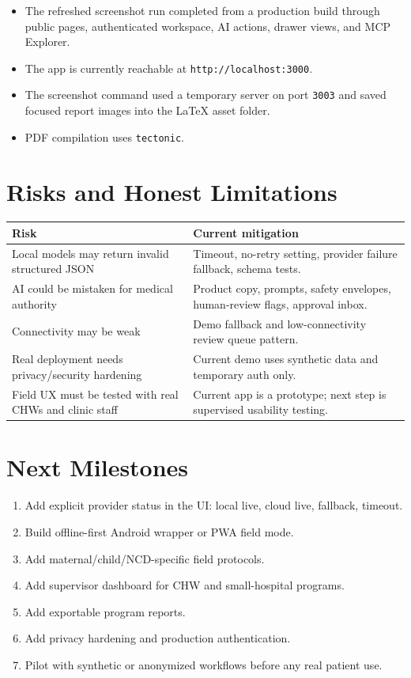 \documentclass[11pt,letterpaper]{article}
\begin{document}
\begin{itemize}
  \item The refreshed screenshot run completed from a production build through public pages, authenticated workspace, AI actions, drawer views, and MCP Explorer.
  \item The app is currently reachable at \texttt{http://localhost:3000}.
  \item The screenshot command used a temporary server on port \texttt{3003} and saved focused report images into the LaTeX asset folder.
  \item PDF compilation uses \texttt{tectonic}.
\end{itemize}

\section{Risks and Honest Limitations}

\begin{table}[H]
\centering
\begin{tabularx}{\linewidth}{@{}L{2.35in}Y@{}}
\toprule
\textbf{Risk} & \textbf{Current mitigation} \\
\midrule
Local models may return invalid structured JSON & Timeout, no-retry setting, provider failure fallback, schema tests. \\
AI could be mistaken for medical authority & Product copy, prompts, safety envelopes, human-review flags, approval inbox. \\
Connectivity may be weak & Demo fallback and low-connectivity review queue pattern. \\
Real deployment needs privacy/security hardening & Current demo uses synthetic data and temporary auth only. \\
Field UX must be tested with real CHWs and clinic staff & Current app is a prototype; next step is supervised usability testing. \\
\bottomrule
\end{tabularx}
\end{table}

\section{Next Milestones}

\begin{enumerate}
  \item Add explicit provider status in the UI: local live, cloud live, fallback, timeout.
  \item Build offline-first Android wrapper or PWA field mode.
  \item Add maternal/child/NCD-specific field protocols.
  \item Add supervisor dashboard for CHW and small-hospital programs.
  \item Add exportable program reports.
  \item Add privacy hardening and production authentication.
  \item Pilot with synthetic or anonymized workflows before any real patient use.
\end{enumerate}
\end{document}
